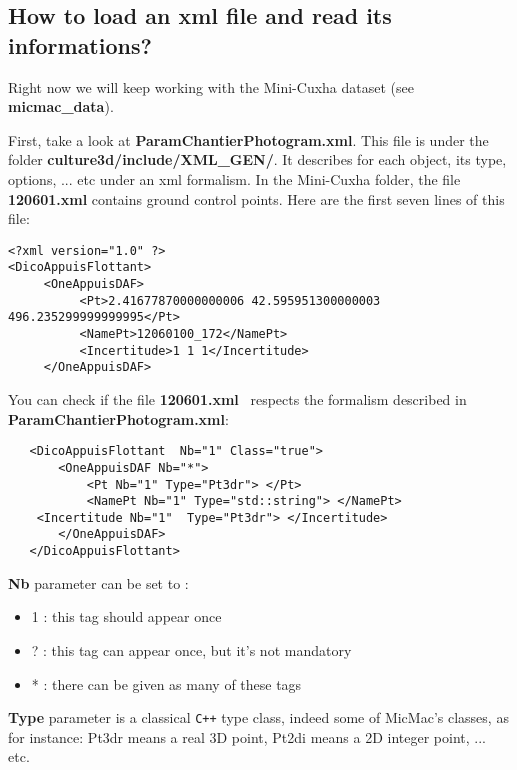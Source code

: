 \subsection{How to load an xml file and read its informations?}
Right now we will keep working with the Mini-Cuxha dataset (see \textbf{micmac\_data}). \newline

First, take a look at \og \textbf{ParamChantierPhotogram.xml}\fg. \newline
This file is under the folder \og\textbf{culture3d/include/XML\_GEN/}\fg. It describes for each object, its type, options, ... etc under an xml formalism. In the Mini-Cuxha folder, the file \textbf{120601.xml} contains ground control points. Here are the first seven lines of this file:
\begin{verbatim}
<?xml version="1.0" ?>
<DicoAppuisFlottant>
     <OneAppuisDAF>
          <Pt>2.41677870000000006 42.595951300000003 496.235299999999995</Pt>
          <NamePt>12060100_172</NamePt>
          <Incertitude>1 1 1</Incertitude>
     </OneAppuisDAF>
\end{verbatim}

You can check if the file \og \textbf{120601.xml} \fg\ respects the formalism described in \textbf{ParamChantierPhotogram.xml}:\newline
\begin{verbatim}
   <DicoAppuisFlottant  Nb="1" Class="true">
       <OneAppuisDAF Nb="*">
           <Pt Nb="1" Type="Pt3dr"> </Pt>
           <NamePt Nb="1" Type="std::string"> </NamePt>
	<Incertitude Nb="1"  Type="Pt3dr"> </Incertitude>
       </OneAppuisDAF>
   </DicoAppuisFlottant>
\end{verbatim}

\textbf{Nb} parameter can be set to :
\begin{itemize}
\item 1 : this tag should appear once
\item ? : this tag can appear once, but it's not mandatory
\item * : there can be given as many of these tags \newline
\end{itemize}

\textbf{Type} parameter is a classical \verb!C++! type class, indeed some of MicMac's classes, as for instance: Pt3dr means a real 3D point, Pt2di means a 2D integer point, ... etc. \newline

